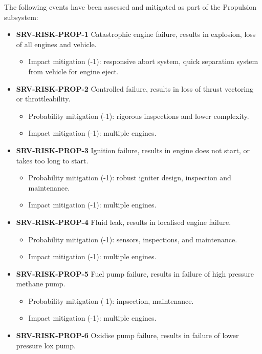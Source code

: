 \noindent The following events have been assessed and mitigated as part of the Propulsion subsystem:

\begin{itemize}
	 \item \textbf{SRV-RISK-PROP-1} Catastrophic engine failure, results in explosion, loss of all engines and vehicle.
	\begin{itemize}
		 \item Impact mitigation (-1): responsive abort system,  quick separation system from vehicle for engine eject.	\end{itemize}
	 \item \textbf{SRV-RISK-PROP-2} Controlled failure, results in loss of thrust vectoring or throttleability.
	\begin{itemize}
		 \item Probability mitigation (-1): rigorous inspections and lower complexity.		 \item Impact mitigation (-1): multiple engines.	\end{itemize}
	 \item \textbf{SRV-RISK-PROP-3} Ignition failure, results in engine does not start, or takes too long to start.
	\begin{itemize}
		 \item Probability mitigation (-1): robust igniter design, inspection and maintenance.		 \item Impact mitigation (-1): multiple engines.	\end{itemize}
	 \item \textbf{SRV-RISK-PROP-4} Fluid leak, results in localised engine failure.
	\begin{itemize}
		 \item Probability mitigation (-1): sensors, inspections, and maintenance.		 \item Impact mitigation (-1): multiple engines.	\end{itemize}
	 \item \textbf{SRV-RISK-PROP-5} Fuel pump failure, results in failure of high pressure methane pump.
	\begin{itemize}
		 \item Probability mitigation (-1): inpsection, maintenance.		 \item Impact mitigation (-1): multiple engines.	\end{itemize}
	 \item \textbf{SRV-RISK-PROP-6} Oxidise pump failure, results in failure of lower pressure lox pump.

\end{itemize}
